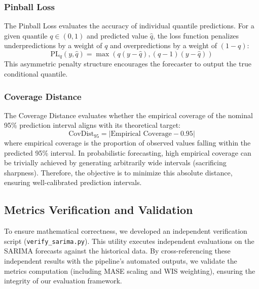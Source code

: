 \subsubsection{Pinball Loss}
The Pinball Loss evaluates the accuracy of individual quantile predictions. For a given quantile $q \in (0, 1)$ and predicted value $\hat{q}$, the loss function penalizes underpredictions by a weight of $q$ and overpredictions by a weight of $(1-q)$:
\begin{equation}
\text{PL}_q(y, \hat{q}) = \max(q(y - \hat{q}), (q - 1)(y - \hat{q}))
\end{equation}
This asymmetric penalty structure encourages the forecaster to output the true conditional quantile.

\subsubsection{Coverage Distance}
The Coverage Distance evaluates whether the empirical coverage of the nominal 95\% prediction interval aligns with its theoretical target:
\begin{equation}
\text{CovDist}_{95} = |\text{Empirical Coverage} - 0.95|
\end{equation}
where empirical coverage is the proportion of observed values falling within the predicted 95\% interval. In probabilistic forecasting, high empirical coverage can be trivially achieved by generating arbitrarily wide intervals (sacrificing sharpness). Therefore, the objective is to minimize this absolute distance, ensuring well-calibrated prediction intervals.

\subsection{Metrics Verification and Validation}
To ensure mathematical correctness, we developed an independent verification script (\texttt{verify\_sarima.py}). This utility executes independent evaluations on the SARIMA forecasts against the historical data. By cross-referencing these independent results with the pipeline's automated outputs, we validate the metrics computation (including MASE scaling and WIS weighting), ensuring the integrity of our evaluation framework.


